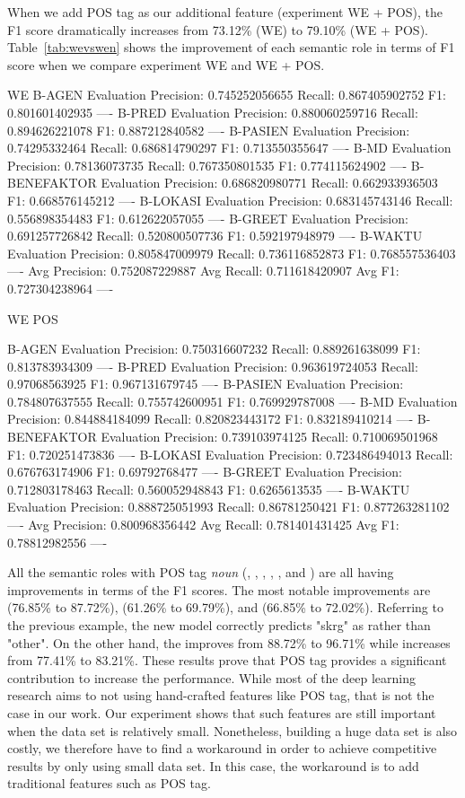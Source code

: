 {{When we add POS tag as our additional feature (experiment WE + POS), the F1 score dramatically increases from 73.12\% (WE) to 79.10\% (WE + POS). Table~\ref{tab:wevswen} shows the improvement of each semantic role in terms of F1 score when we compare experiment WE and WE + POS.

WE 
B-AGEN Evaluation
Precision:  0.745252056655
Recall:  0.867405902752
F1:  0.801601402935
----
B-PRED Evaluation
Precision:  0.880060259716
Recall:  0.894626221078
F1:  0.887212840582
----
B-PASIEN Evaluation
Precision:  0.74295332464
Recall:  0.686814790297
F1:  0.713550355647
----
B-MD Evaluation
Precision:  0.78136073735
Recall:  0.767350801535
F1:  0.774115624902
----
B-BENEFAKTOR Evaluation
Precision:  0.686820980771
Recall:  0.662933936503
F1:  0.668576145212
----
B-LOKASI Evaluation
Precision:  0.683145743146
Recall:  0.556898354483
F1:  0.612622057055
----
B-GREET Evaluation
Precision:  0.691257726842
Recall:  0.520800507736
F1:  0.592197948979
----
B-WAKTU Evaluation
Precision:  0.805847009979
Recall:  0.736116852873
F1:  0.768557536403
----
Avg Precision:  0.752087229887
Avg Recall:  0.711618420907
Avg F1:  0.727304238964
----

WE POS

B-AGEN Evaluation
Precision:  0.750316607232
Recall:  0.889261638099
F1:  0.813783934309
----
B-PRED Evaluation
Precision:  0.963619724053
Recall:  0.97068563925
F1:  0.967131679745
----
B-PASIEN Evaluation
Precision:  0.784807637555
Recall:  0.755742600951
F1:  0.769929787008
----
B-MD Evaluation
Precision:  0.844884184099
Recall:  0.820823443172
F1:  0.832189410214
----
B-BENEFAKTOR Evaluation
Precision:  0.739103974125
Recall:  0.710069501968
F1:  0.720251473836
----
B-LOKASI Evaluation
Precision:  0.723486494013
Recall:  0.676763174906
F1:  0.69792768477
----
B-GREET Evaluation
Precision:  0.712803178463
Recall:  0.560052948843
F1:  0.6265613535
----
B-WAKTU Evaluation
Precision:  0.888725051993
Recall:  0.86781250421
F1:  0.877263281102
----
Avg Precision:  0.800968356442
Avg Recall:  0.781401431425
Avg F1:  0.78812982556
----

All the semantic roles with POS tag \textit{noun} (\agent, \patient, \beneficiary, \location, \greet, and \timesrl) are all having improvements in terms of the F1 scores. The most notable improvements are \timesrl (76.85\% to 87.72\%), \location (61.26\% to 69.79\%), and \beneficiary (66.85\% to 72.02\%). Referring to the previous example, the new model correctly predicts "skrg" as \timesrl rather than "other". On the other hand, the \predicate improves from 88.72\% to 96.71\% while \modal increases from 77.41\% to 83.21\%. These results prove that POS tag provides a significant contribution to increase the performance. While most of the deep learning research aims to not using hand-crafted features like POS tag, that is not the case in our work. Our experiment shows that such features are still important when the data set is relatively small. Nonetheless, building a huge data set is also costly, we therefore have to find a workaround in order to achieve competitive results by only using small data set. In this case, the workaround is to add traditional features such as POS tag.

}}
